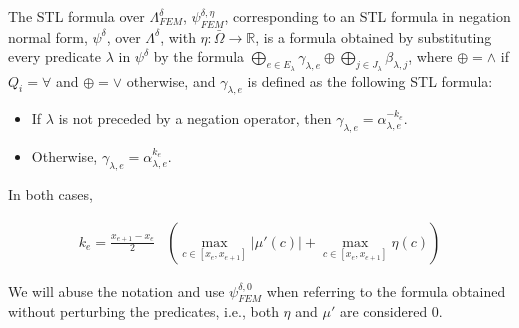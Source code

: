 \documentclass[oribibl]{llncs/llncs}
\newcommand*{\R}{\mathbb{R}}
\begin{document}
\begin{definition} 
\label{def:eta_approximation}
    The STL formula over $\Lambda^{\delta}_{FEM}$, $\psi^{\delta, \eta}_{FEM}$, corresponding to an STL
    formula in negation normal form, $\psi^\delta$, over $\Lambda^\delta$, with
    $\eta : \bar\Omega \to \R$, is a formula obtained by substituting every
    predicate $\lambda$ in $\psi^\delta$ by the formula $\bigoplus_{e \in
    E_\lambda} \gamma_{\lambda,e} \oplus \bigoplus_{j \in J_\lambda} \beta_{\lambda, j}$, 
    where $\oplus = \wedge$ if $Q_i = \forall$ and $\oplus = \vee$
    otherwise, and $\gamma_{\lambda,e}$ is defined as the following STL formula:

    \begin{itemize}
        \item If $\lambda$ is not preceded by a negation operator, then
            $\gamma_{\lambda, e} = \alpha_{\lambda, e}^{-k_e}$.
        \item Otherwise, $\gamma_{\lambda, e} = \alpha_{\lambda, e}^{k_e}$.
    \end{itemize}

    In both cases, 

    \begin{equation}
    \begin{aligned}
        k_e = \frac{x_{e+1} - x_e}{2} & \left (\max_{c \in [x_e, x_{e+1}]}
        |\mu'(c)| + \max_{c \in [x_e, x_{e+1}]} \eta(c) \right )
    \end{aligned}
    \end{equation}

    We will abuse the notation and use $\psi^{\delta, 0}_{FEM}$ when referring
    to the formula obtained without perturbing the predicates, i.e., both $\eta$
    and $\mu'$ are considered 0.
\end{definition}
\end{document}
